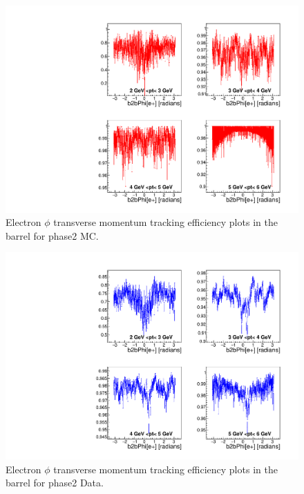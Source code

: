 \documentclass[a4paper,11pt,twosided,final,german,openbib,pdftex,listof=totoc,bibliography=totoc]{scrbook}
\begin{document}
\begin{appendix}
\clearpage





\begin{figure}[!htbp]
	\centering
	\includegraphics[width=\textwidth]{Plots/master/xPtMPhiemBarrel_MC}
	\caption[Transverse Momentum $\phi$ Electron Barrel Efficiency Phase2 MC]{Electron $\phi$ transverse momentum tracking efficiency plots in the barrel for phase2 MC.}
	\label{plt:PtMPhiemBarrel_MC}
\end{figure}


\begin{figure}[!htbp]
	\centering
	\includegraphics[width=\textwidth]{Plots/master/xPtMPhiemBarrel_Data}
	\caption[Transverse Momentum $\phi$ Electron Barrel Efficiency Phase2 Data]{Electron $\phi$ transverse momentum tracking efficiency plots in the barrel for phase2 Data.}
	\label{plt:PtMPhiemBarrel_Data}
\end{figure}







\end{appendix}
\end{document}
